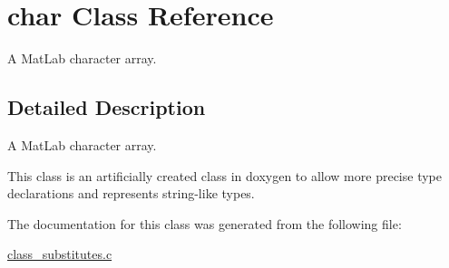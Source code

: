 \hypertarget{a00003}{\section{char Class Reference}
\label{a00003}
}


A Mat\-Lab character array.  




\subsection{Detailed Description}
A Mat\-Lab character array. 

This class is an artificially created class in doxygen to allow more precise type declarations and represents string-\/like types. 

The documentation for this class was generated from the following file\-:\begin{DoxyCompactItemize}
\item 
\hyperlink{a00016}{class\-\_\-substitutes.\-c}\end{DoxyCompactItemize}
